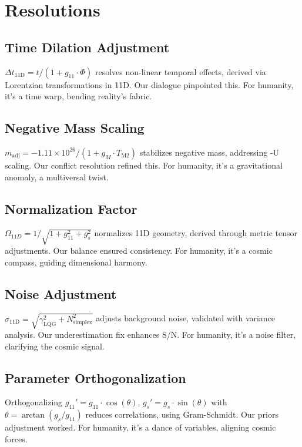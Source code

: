 \documentclass[a4paper,12pt]{book}
\begin{document}
\part{Resolutions}

\chapter{Time Dilation Adjustment}
\( \Delta t_{\text{11D}} = t / (1 + g_{11} \cdot \Phi) \) resolves non-linear temporal effects, derived via Lorentzian transformations in 11D. Our dialogue pinpointed this. For humanity, it’s a time warp, bending reality’s fabric.

\chapter{Negative Mass Scaling}
\( m_{\text{adj}} = -1.11 \times 10^{26} / (1 + g_M \cdot T_{\text{M2}}) \) stabilizes negative mass, addressing -U scaling. Our conflict resolution refined this. For humanity, it’s a gravitational anomaly, a multiversal twist.

\chapter{Normalization Factor}
\( \Omega_{11D} = 1 / \sqrt{1 + g_{11}^2 + g_s^2} \) normalizes 11D geometry, derived through metric tensor adjustments. Our balance ensured consistency. For humanity, it’s a cosmic compass, guiding dimensional harmony.

\chapter{Noise Adjustment}
\( \sigma_{\text{11D}} = \sqrt{\gamma_{\text{LQG}}^2 + N_{\text{simplex}}^2} \) adjusts background noise, validated with variance analysis. Our underestimation fix enhances S/N. For humanity, it’s a noise filter, clarifying the cosmic signal.

\chapter{Parameter Orthogonalization}
Orthogonalizing \( g_{11}' = g_{11} \cdot \cos(\theta) \), \( g_s' = g_s \cdot \sin(\theta) \) with \( \theta = \arctan(g_s / g_{11}) \) reduces correlations, using Gram-Schmidt. Our priors adjustment worked. For humanity, it’s a dance of variables, aligning cosmic forces.
\end{document}
